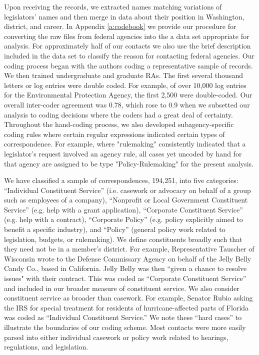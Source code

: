 \documentclass[12pt]{article}
\begin{document}
Upon receiving the records, we extracted names matching variations of legislators' names and then merge in data about their position in Washington, district, and career. In Appendix \ref{a:codebook} we provide our procedure for converting the raw files from federal agencies into the a data set appropriate for analysis. For approximately half of our contacts we also use the brief description included in the data set to classify the reason for contacting federal agencies.  Our coding process began with the authors coding a representative sample of records. We then trained undergraduate and graduate RAs. The first several thousand letters or log entries were double coded. For example, of over 10,000 log entries for the Environmental Protection Agency, the first 2,500 were double-coded. Our overall inter-coder agreement was 0.78, which rose to 0.9 when we subsetted our analysis to coding decisions where the coders had a great deal of certainty. Throughout the hand-coding process, we also developed subagency-specific coding rules where certain regular expressions indicated certain types of correspondence. For example, where "rulemaking" consistently indicated that a legislator's request involved an agency rule, all cases yet uncoded by hand for that agency are assigned to be type "Policy-Rulemaking" for the present analysis.   

We have classified a sample of correspondences, 194,251, into five categories: ``Individual Constituent Service'' (i.e. casework or advocacy on behalf of a group such as employees of a company), ``Nonprofit or Local Government Constituent Service'' (e.g. help with a grant application), ``Corporate Constituent Service'' (e.g. help with a contract), ``Corporate Policy'' (e.g. policy explicitly aimed to benefit a specific industry), and ``Policy'' (general policy work related to legislation, budgets, or rulemaking). We define constituents broadly such that they need not be in a member's district. For example, Representative Tauscher of Wisconsin wrote to the Defense Commissary Agency on behalf of the Jelly Belly Candy Co., based in California. Jelly Belly was then ``given a chance to resolve issues" with their contract. This was coded as ``Corporate Constituent Service'' and included in our broader measure of constituent service. We also consider constituent service as broader than casework. For example, Senator Rubio asking the IRS for special treatment for residents of hurricane-affected parts of Florida was coded as ``Individual Constituent Service.'' We note these ``hard cases'' to illustrate the boundaries of our coding scheme. Most contacts were more easily parsed into either individual casework or policy work related to hearings, regulations, and legislation.
\end{document}
